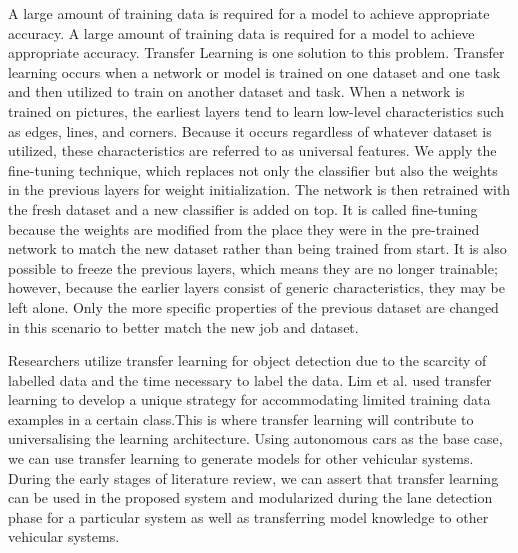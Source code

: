 A large amount of training data is required for a model to achieve appropriate accuracy. A large amount of training data is required for a model to achieve appropriate accuracy. Transfer Learning is one solution to this problem. Transfer learning occurs when a network or model is trained on one dataset and one task and then utilized to train on another dataset and task. When a network is trained on pictures, the earliest layers tend to learn low-level characteristics such as edges, lines, and corners. Because it occurs regardless of whatever dataset is utilized, these characteristics are referred to as universal features.
We apply the fine-tuning technique, which replaces not only the classifier but also the weights in the previous layers for weight initialization. The network is then retrained with the fresh dataset and a new classifier is added on top. It is called fine-tuning because the weights are modified from the place they were in the pre-trained network to match the new dataset rather than being trained from start. It is also possible to freeze the previous layers, which means they are no longer trainable; however, because the earlier layers consist of generic characteristics, they may be left alone. Only the more specific properties of the previous dataset are changed in this scenario to better match the new job and dataset.\cite{strömgren}

Researchers utilize transfer learning for object detection due to the scarcity of labelled data and the time necessary to label the data. Lim et al. \cite{lim_1970} used transfer learning to develop a unique strategy for accommodating limited training data examples in a certain class.This is where transfer learning will contribute to universalising the learning architecture. Using autonomous cars as the base case, we can use transfer learning to generate models for other vehicular systems. During the early stages of literature review, we can assert that transfer learning can be used in the proposed system and modularized during the lane detection phase for a particular system as well as transferring model knowledge to other vehicular systems. 
